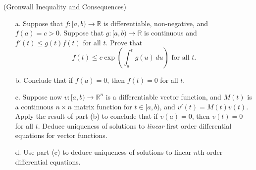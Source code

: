\documentclass[Shifrin_Solutions_Spring_2018]{subfiles}
\begin{document}
\begin{exercise}(Gronwall Inequality and Consequences)
\begin{itemize}
\item[a.] Suppose that $f:[a,b)\rightarrow \mathbb{R}$ is differentiable, non-negative, and $f(a) = c > 0$. Suppose that $g:[a,b) \rightarrow \mathbb{R}$ is continuous and $f'(t) \leq g(t)f(t)$ for all $t$. Prove that
\[
f(t) \leq c \exp\left(\int_a^t g(u)\, du\right) \text{ for all $t$.}
\]

\item[b.] Conclude that if $f(a) = 0$, then $f(t) = 0$ for all $t$.

\item[c.] Suppose now $v:[a,b)\rightarrow \mathbb{R}^n$ is a differentiable vector function, and $M(t)$ is a continuous $n\times n$ matrix function for $t \in [a,b)$, and $v'(t) = M(t)v(t)$. Apply the result of part (b) to conclude that if $v(a) = 0$, then $v(t) = 0$ for all $t$. Deduce uniqueness of solutions to \emph{linear} first order differential equations for vector functions.

\item[d.] Use part (c) to deduce uniqueness of solutions to linear $n$th order differential equations.

\end{itemize}
\end{exercise}
\end{document}
